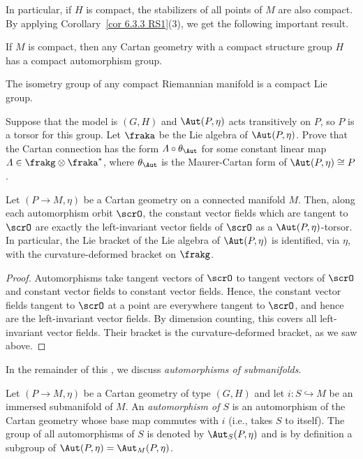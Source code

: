 In particular, if $H$ is compact, the stabilizers of all points of $M$ are also compact. By applying Corollary~\ref{cor 6.3.3 RS1}(3), we get the following important result.

\begin{cor}
    If $M$ is compact, then any Cartan geometry with a compact structure group $H$ has a compact automorphism group.
\end{cor}

\begin{cor}\label{cor compact isometry group}
    The isometry group of any compact Riemannian manifold is a compact Lie group.
\end{cor}

\begin{xca}
    Suppose that the model is $(G,H)$ and $\Aut(P,\eta)$ acts transitively on $P$, so $P$ is a torsor for this group. Let $\fraka$ be the Lie algebra of $\Aut(P,\eta)$. Prove that the Cartan connection has the form $\varLambda\circ\theta_{\Aut}$ for some constant linear map $\varLambda\in\frakg\otimes\fraka^\ast$, where $\theta_{\Aut}$ is the Maurer-Cartan form of $\Aut(P,\eta)\cong P$.
\end{xca}


\begin{cor}
    Let $(P\to M,\eta)$ be a Cartan geometry on a connected manifold $M$. Then, along each automorphism orbit $\scrO$, the constant vector fields which are tangent to $\scrO$ are exactly the left-invariant vector fields of $\scrO$ as a $\Aut(P,\eta)$-torsor. In particular, the Lie bracket of the Lie algebra of $\Aut(P,\eta)$ is identified, via $\eta$, with the curvature-deformed bracket on $\frakg$.
\end{cor}
\begin{proof}
    Automorphisms take tangent vectors of $\scrO$ to tangent vectors of $\scrO$ and constant vector fields to constant vector fields. Hence, the constant vector fields tangent to $\scrO$ at a point are everywhere tangent to $\scrO$, and hence are the left-invariant vector fields. By dimension counting, this covers all left-invariant vector fields. Their bracket is the curvature-deformed bracket, as we saw above.
\end{proof}


\PRLsep


In the remainder of this \sect, we discuss \emph{automorphisms of submanifolds}.


\begin{defn}
    Let $(P\to M,\eta)$ be a Cartan geometry of type $(G,H)$ and let $i:S\hookrightarrow M$ be an immersed submanifold of $M$. An \emph{automorphism of $S$} is an automorphism of the Cartan geometry whose base map commutes with $i$ (i.e., takes $S$ to itself). The group of all automorphisms of $S$ is denoted by $\Aut_S(P,\eta)$ and is by definition a subgroup of $\Aut(P,\eta)=\Aut_M(P,\eta)$.
\end{defn}


